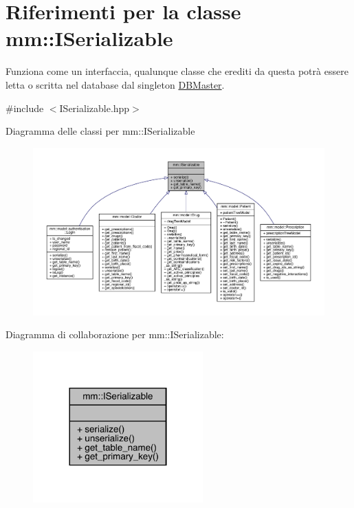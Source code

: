 \hypertarget{classmm_1_1_i_serializable}{}\section{Riferimenti per la classe mm\+:\+:I\+Serializable}
\label{classmm_1_1_i_serializable}


Funziona come un interfaccia, qualunque classe che erediti da questa potrà essere letta o scritta nel database dal singleton \hyperlink{classmm_1_1_d_b_master}{D\+B\+Master}.  




{\ttfamily \#include $<$I\+Serializable.\+hpp$>$}



Diagramma delle classi per mm\+:\+:I\+Serializable\nopagebreak
\begin{figure}[H]
\begin{center}
\leavevmode
\includegraphics[width=350pt]{d5/d4e/classmm_1_1_i_serializable__inherit__graph}
\end{center}
\end{figure}


Diagramma di collaborazione per mm\+:\+:I\+Serializable\+:\nopagebreak
\begin{figure}[H]
\begin{center}
\leavevmode
\includegraphics[width=185pt]{db/dc2/classmm_1_1_i_serializable__coll__graph}
\end{center}
\end{figure}
